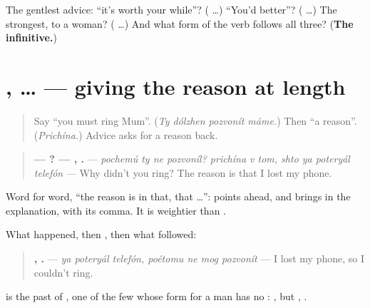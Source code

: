 \begin{tcolorbox}[breakable,colback=teal!4,colframe=teal!35!black,title={Before you move on}]
The gentlest advice: \textquotedblleft{}it's worth your while\textquotedblright{}? (\emph{\textbf{ }} …) \textquotedblleft{}You'd better\textquotedblright{}? (\emph{\textbf{ }} …) The strongest, to a woman? (\emph{\textbf{ }} …) And what form of the verb follows all three? (\textbf{The infinitive.})
\end{tcolorbox}
\section[\texorpdfstring{\ru{причина} \ru{в} \ru{том} … (prichína v tom …)}{причина в том … (prichína v tom …)}]{  ,  … — giving the reason at length}

\label{lesson:RU-C264-prichina-v-tom}



\begin{quote}
Say \textquotedblleft{}you must ring Mum\textquotedblright{}. (\emph{Ty dólzhen pozvonít máme.}) Then \textquotedblleft{}a reason\textquotedblright{}. (\emph{Prichína.}) Advice asks for a reason back.
\end{quote}

\begin{grammarlens}[title={Grammar Lens: \ru{причина} \ru{в} \ru{том}, \ru{что} …}]
\begin{quote}
\textbf{—    ? —   ,    .} — \emph{pochemú ty ne pozvoníl? prichína v tom, shto ya poteryál telefón} — Why didn't you ring? The reason is that I lost my phone.
\end{quote}

Word for word, \textquotedblleft{}the reason is in that, that …\textquotedblright{}: \textbf{ } points ahead, and \textbf{} brings in the explanation, with its comma. It is weightier than \emph{ }.
\end{grammarlens}

\begin{grammarlens}[title={Grammar Lens: an explanation in three steps}]
What happened, then \textbf{}, then what followed:

\begin{quote}
\textbf{  ,    .} — \emph{ya poteryál telefón, poétomu ne mog pozvonít} — I lost my phone, so I couldn't ring.
\end{quote}

\textbf{} is the past of \emph{}, one of the few whose form for a man has no \emph{}: \emph{}, but \emph{}, \emph{}.
\end{grammarlens}

